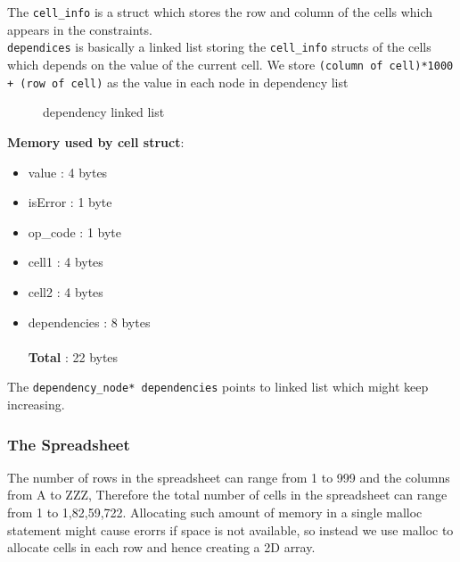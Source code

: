 \documentclass{article}
\begin{document}
    \\\\
    The \texttt{cell\_info} is a struct which stores the row and column of the cells which appears in the constraints.
    \\
    \texttt{dependices} is basically a linked list storing the \texttt{cell\_info} structs of the cells which depends on the value of the current cell.  We store \texttt{(column of cell)*1000 + (row of cell)} as the value in each node in dependency list
    \\
\begin{figure}[H]
    \centering
    \caption{dependency linked list}
    \label{fig:simple-diagram}
\end{figure}

    \textbf{Memory used by cell struct}:
    \begin{itemize}
        \item value :  4 bytes
        \item isError : 1 byte
        \item op\_code : 1 byte
        \item cell1 : 4 bytes
        \item cell2 : 4 bytes
        \item dependencies : 8 bytes
    \\\\\textbf{Total} : 22 bytes
    \end{itemize}
    The \texttt{dependency\_node{*} dependencies} points to linked list which might keep increasing.

    \subsubsection{The Spreadsheet}
    The number of rows in the spreadsheet can range from 1 to 999 and the columns from A to ZZZ, Therefore the total number of cells in the spreadsheet can range from 1 to 1,82,59,722. Allocating such amount of memory in a single malloc statement might cause erorrs if space is not available, so instead we use malloc to allocate cells in each row and hence creating a 2D array.
\end{document}
